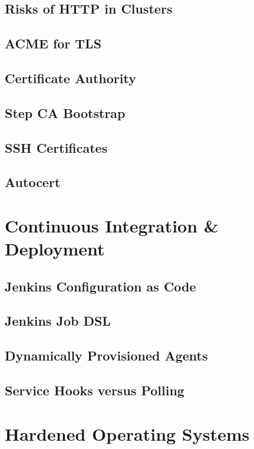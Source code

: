 \section{Risks of HTTP in Clusters}

\section{ACME for TLS}

\section{Certificate Authority}

\section{Step CA Bootstrap}

\section{SSH Certificates}

\section{Autocert}

\chapter{Continuous Integration \& Deployment}

\section{Jenkins Configuration as Code}

\section{Jenkins Job DSL}

\section{Dynamically Provisioned Agents}

\section{Service Hooks versus Polling}

\chapter{Hardened Operating Systems}

